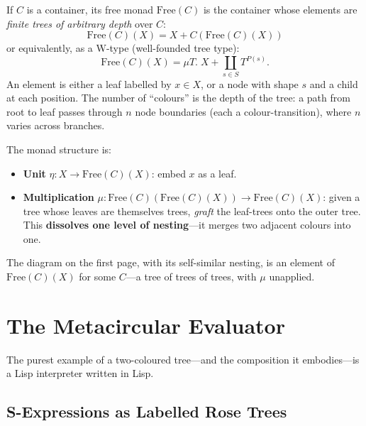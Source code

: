 \documentclass[11pt,a4paper]{article}
\theoremstyle{definition}
\theoremstyle{plain}
\newcommand{\Free}{\mathrm{Free}}
\begin{document}
If $C$ is a container, its free monad $\Free(C)$ is the container whose
elements are \emph{finite trees of arbitrary depth} over $C$:
\[
\Free(C)(X) = X + C(\Free(C)(X))
\]
or equivalently, as a W-type (well-founded tree type):
\[
\Free(C)(X) = \mu T.\; X + \coprod_{s \in S} T^{P(s)}.
\]
An element is either a leaf labelled by $x \in X$, or a node with shape $s$
and a child at each position. The number of ``colours'' is the depth of the
tree: a path from root to leaf passes through $n$ node boundaries (each a
colour-transition), where $n$ varies across branches.

The monad structure is:
\begin{itemize}[nosep]
\item \textbf{Unit} $\eta : X \to \Free(C)(X)$: embed $x$ as a leaf.
\item \textbf{Multiplication} $\mu : \Free(C)(\Free(C)(X)) \to \Free(C)(X)$:
  given a tree whose leaves are themselves trees, \emph{graft} the leaf-trees
  onto the outer tree. This \textbf{dissolves one level of nesting}---it
  merges two adjacent colours into one.
\end{itemize}

The diagram on the first page, with its self-similar nesting, is an element
of $\Free(C)(X)$ for some $C$---a tree of trees of trees, with $\mu$ unapplied.

\section{The Metacircular Evaluator}

The purest example of a two-coloured tree---and the composition it
embodies---is a Lisp interpreter written in Lisp.

\subsection{S-Expressions as Labelled Rose Trees}
\end{document}
